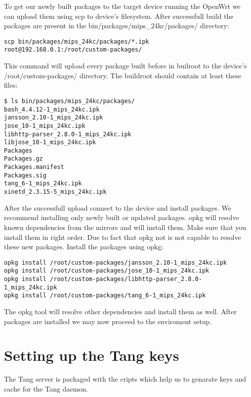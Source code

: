 To get our newly built packages to the target device running the OpenWrt we can upload them using scp to device's filesystem.
After successfull build the packages are present in the bin/packages/mips\_24kc/packages/ directory:
\begin{lstlisting}[columns=fixed,basicstyle=\ttfamily\footnotesize,tabsize=4,backgroundcolor=\color{yellow!10}]
scp bin/packages/mips_24kc/packages/*.ipk root@192.168.0.1:/root/custom-packages/
\end{lstlisting}
This command will upload every package built before in builroot to the device's /root/custom-packages/ directory.
The buildroot should contain at least these files:
\begin{lstlisting}[columns=fixed,basicstyle=\ttfamily\footnotesize,tabsize=4,backgroundcolor=\color{yellow!10}]
$ ls bin/packages/mips_24kc/packages/
bash_4.4.12-1_mips_24kc.ipk
jansson_2.10-1_mips_24kc.ipk
jose_10-1_mips_24kc.ipk
libhttp-parser_2.8.0-1_mips_24kc.ipk
libjose_10-1_mips_24kc.ipk
Packages
Packages.gz
Packages.manifest
Packages.sig
tang_6-1_mips_24kc.ipk
xinetd_2.3.15-5_mips_24kc.ipk
\end{lstlisting}
After the successfull upload connect to the device and install packages.
We recommend installing only newly built or updated packages.
opkg will resolve known dependencies from the mirrors and will install them.
Make sure that you install them in right order.
Due to fact that opkg not is not capable to resolve these new packages.
Install the packages using opkg:
\begin{lstlisting}[columns=fixed,basicstyle=\ttfamily\footnotesize,tabsize=4,backgroundcolor=\color{yellow!10}]
opkg install /root/custom-packages/jansson_2.10-1_mips_24kc.ipk
opkg install /root/custom-packages/jose_10-1_mips_24kc.ipk
opkg install /root/custom-packages/libhttp-parser_2.8.0-1_mips_24kc.ipk
opkg install /root/custom-packages/tang_6-1_mips_24kc.ipk
\end{lstlisting}
The opkg tool will resolve other dependencies and install them as well.
After packages are installed we may now proceed to the enviroment setup.



\section{Setting up the Tang keys}
The Tang server is packaged with the cripts which help us to genarate keys and cache for the Tang daemon.


